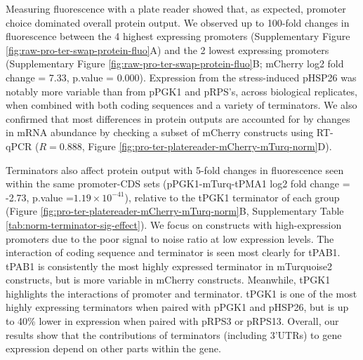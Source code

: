\documentclass[../main.tex]{subfiles}
\begin{document}
Measuring fluorescence with a plate reader showed that, as expected, promoter choice dominated overall protein output.
We observed up to 100-fold changes in fluorescence between the 4 highest expressing promoters (Supplementary Figure \ref{fig:raw-pro-ter-swap-protein-fluo}A) and the 2 lowest expressing promoters (Supplementary Figure \ref{fig:raw-pro-ter-swap-protein-fluo}B; mCherry log2 fold change = 7.33, p.value = 0.000).
Expression from the stress-induced pHSP26 was notably more variable than from pPGK1 and pRPS's, across biological replicates, when combined with both coding sequences and a variety of terminators.
We also confirmed that most differences in protein outputs are accounted for by changes in mRNA abundance by checking a subset of mCherry constructs using RT-qPCR (\(R = 0.888\), Figure \ref{fig:pro-ter-platereader-mCherry-mTurq-norm}D).

Terminators also affect protein output with 5-fold changes in fluorescence seen within the same promoter-CDS sets (pPGK1-mTurq-tPMA1 log2 fold change = -2.73, p.value =\(1.19 \times 10^{-41}\)), relative to the tPGK1 terminator of each group (Figure \ref{fig:pro-ter-platereader-mCherry-mTurq-norm}B, Supplementary Table \ref{tab:norm-terminator-sig-effect}).
We focus on constructs with high-expression promoters due to the poor signal to noise ratio at low expression levels.
The interaction of coding sequence and terminator is seen most clearly for tPAB1.
tPAB1 is consistently the most highly expressed terminator in mTurquoise2 constructs, but is more variable in mCherry constructs.
Meanwhile, tPGK1 highlights the interactions of promoter and terminator.
tPGK1 is one of the most highly expressing terminators when paired with pPGK1 and pHSP26, but is up to 40\% lower in expression when paired with pRPS3 or pRPS13.
Overall, our results show that the contributions of terminators (including 3'UTRs) to gene expression depend on other parts within the gene.
\end{document}
